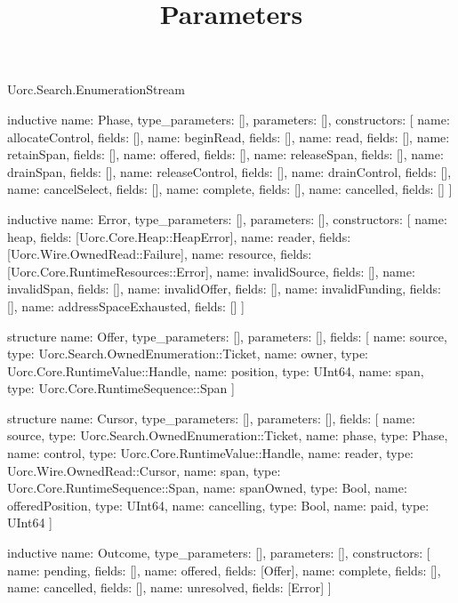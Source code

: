 \begin{lexlean}{Uorc.Search.EnumerationStream}
\title{Parameters}
\begin{semanticmodule}
inductive{
  name: Phase,
  type_parameters: [],
  parameters: [],
  constructors: [
    {name: allocateControl, fields: []},
    {name: beginRead, fields: []},
    {name: read, fields: []},
    {name: retainSpan, fields: []},
    {name: offered, fields: []},
    {name: releaseSpan, fields: []},
    {name: drainSpan, fields: []},
    {name: releaseControl, fields: []},
    {name: drainControl, fields: []},
    {name: cancelSelect, fields: []},
    {name: complete, fields: []},
    {name: cancelled, fields: []}
  ]
}

inductive{
  name: Error,
  type_parameters: [],
  parameters: [],
  constructors: [
    {name: heap, fields: [Uorc.Core.Heap::HeapError]},
    {name: reader, fields: [Uorc.Wire.OwnedRead::Failure]},
    {name: resource, fields: [Uorc.Core.RuntimeResources::Error]},
    {name: invalidSource, fields: []},
    {name: invalidSpan, fields: []},
    {name: invalidOffer, fields: []},
    {name: invalidFunding, fields: []},
    {name: addressSpaceExhausted, fields: []}
  ]
}

structure{
  name: Offer,
  type_parameters: [],
  parameters: [],
  fields: [
    {name: source, type: Uorc.Search.OwnedEnumeration::Ticket},
    {name: owner, type: Uorc.Core.RuntimeValue::Handle},
    {name: position, type: UInt64},
    {name: span, type: Uorc.Core.RuntimeSequence::Span}
  ]
}

structure{
  name: Cursor,
  type_parameters: [],
  parameters: [],
  fields: [
    {name: source, type: Uorc.Search.OwnedEnumeration::Ticket},
    {name: phase, type: Phase},
    {name: control, type: Uorc.Core.RuntimeValue::Handle},
    {name: reader, type: Uorc.Wire.OwnedRead::Cursor},
    {name: span, type: Uorc.Core.RuntimeSequence::Span},
    {name: spanOwned, type: Bool},
    {name: offeredPosition, type: UInt64},
    {name: cancelling, type: Bool},
    {name: paid, type: UInt64}
  ]
}

inductive{
  name: Outcome,
  type_parameters: [],
  parameters: [],
  constructors: [
    {name: pending, fields: []},
    {name: offered, fields: [Offer]},
    {name: complete, fields: []},
    {name: cancelled, fields: []},
    {name: unresolved, fields: [Error]}
  ]
}


\end{semanticmodule}
\end{lexlean}
